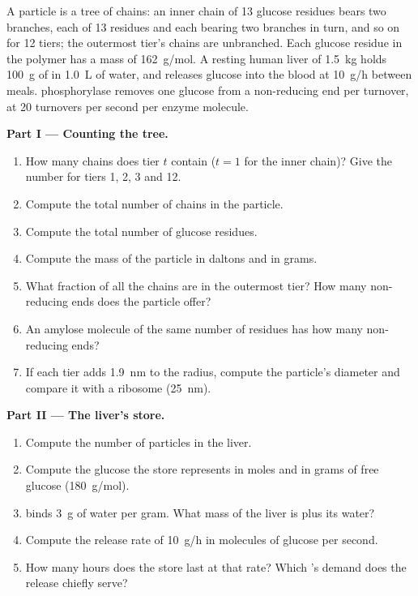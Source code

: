 \begin{problem}
\label{pb:b1:carbohydrates:1}
A  particle is a tree of chains: an inner chain of
\qty{13}{} glucose residues bears two branches, each of \qty{13}{}
residues and each bearing two branches in turn, and so on for
\qty{12}{} tiers; the outermost tier's chains are unbranched. Each
glucose residue in the polymer has a mass of \qty{162}{g/mol}. A
resting human liver of \qty{1.5}{kg} holds \qty{100}{g} of  in
\qty{1.0}{L} of  water, and releases glucose into the blood at
\qty{10}{g/h} between meals.  phosphorylase removes one glucose
from a non-reducing end per turnover, at \qty{20}{} turnovers per second
per enzyme molecule.

\medskip
\noindent\textbf{Part I --- Counting the tree.}
\begin{enumerate}
  \item How many chains does tier $t$ contain ($t = 1$ for the inner
        chain)? Give the number for tiers 1, 2, 3 and 12.
  \item Compute the total number of chains in the particle.
  \item Compute the total number of glucose residues.
  \item Compute the mass of the particle in daltons and in grams.
  \item What fraction of all the chains are in the outermost tier?
        How many non-reducing ends does the particle offer?
  \item An amylose molecule of the same number of residues has how
        many non-reducing ends?
  \item If each tier adds \qty{1.9}{nm} to the radius, compute the
        particle's diameter and compare it with a ribosome
        (\qty{25}{nm}).
\end{enumerate}

\medskip
\noindent\textbf{Part II --- The liver's store.}
\begin{enumerate}[resume]
  \item Compute the number of particles in the liver.
  \item Compute the glucose the store represents in moles and in
        grams of free glucose (\qty{180}{g/mol}).
  \item {} binds \qty{3}{g} of water per gram. What mass of the
        liver is  plus its water?
  \item Compute the release rate of \qty{10}{g/h} in molecules of
        glucose per second.
  \item How many hours does the store last at that rate? Which 's
        demand does the release chiefly serve?
\end{enumerate}


\end{problem}
